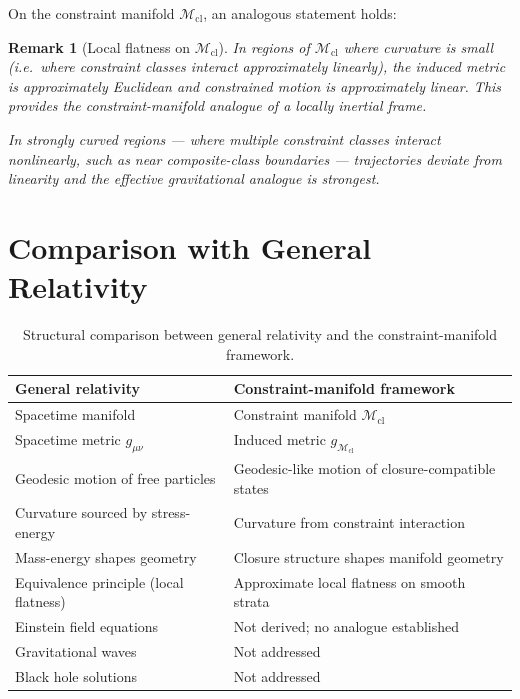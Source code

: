 \documentclass[12pt]{article}
\newtheorem{remark}[theorem]{Remark}
\newcommand{\Mcl}{\mathcal{M}_{\mathrm{cl}}}
\begin{document}
On the constraint manifold $\Mcl$, an analogous statement holds:

\begin{remark}[Local flatness on $\Mcl$]
In regions of $\Mcl$ where curvature is small (i.e.\ where constraint classes interact approximately linearly), the induced metric is approximately Euclidean and constrained motion is approximately linear. This provides the constraint-manifold analogue of a locally inertial frame.

In strongly curved regions --- where multiple constraint classes interact nonlinearly, such as near composite-class boundaries --- trajectories deviate from linearity and the effective gravitational analogue is strongest.
\end{remark}

\section{Comparison with General Relativity}\label{sec:comparison}

\begin{table}[ht]
\centering
\caption{Structural comparison between general relativity and the constraint-manifold framework.}
\label{tab:comparison}
\begin{tabular}{@{}ll@{}}
\toprule
General relativity & Constraint-manifold framework \\
\midrule
Spacetime manifold & Constraint manifold $\Mcl$ \\
Spacetime metric $g_{\mu\nu}$ & Induced metric $g_{\Mcl}$ \\
Geodesic motion of free particles & Geodesic-like motion of closure-compatible states \\
Curvature sourced by stress-energy & Curvature from constraint interaction \\
Mass-energy shapes geometry & Closure structure shapes manifold geometry \\
Equivalence principle (local flatness) & Approximate local flatness on smooth strata \\
Einstein field equations & Not derived; no analogue established \\
Gravitational waves & Not addressed \\
Black hole solutions & Not addressed \\
\bottomrule
\end{tabular}
\end{table}
\end{document}
